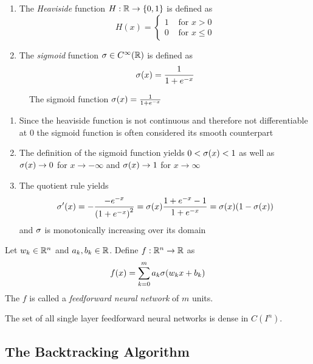 \begin{definition}
    \hfill
    \begin{enumerate}
        \item The \emph{Heaviside} function \( H: \mathbb{R} \to \{ 0, 1 \} \) is defined as
              \[
                  H(x) = \left \{
                  \begin{array}{ll}
                      1 & \text{ for } x > 0  \\
                      0 & \text{ for }x \le 0
                  \end{array}
                  \right.
              \]
        \item The \emph{sigmoid} function \( \sigma \in C^\infty(\mathbb{R}) \) is defined as
              \[
                  \sigma(x) = \frac{1}{1 + e^{-x}}
              \]
    \end{enumerate}
\end{definition}
\bigskip


\begin{figure}[H]
    \centering
    \plotsigmoid{}
    \caption{The sigmoid function \( \sigma(x) = \frac{1}{1 + e^{-x}} \)}\label{fig:sigmoid}
\end{figure}
\bigskip


\begin{remarks}
    \hfill
    \begin{enumerate}
        \item Since the heaviside function is not continuous and therefore not differentiable 
            at \( 0 \) the sigmoid function is often considered its smooth counterpart
        \item The definition of the sigmoid function yields \( 0 < \sigma(x) < 1 \) as well as
              \( \sigma(x) \to 0 \) for \( x \to -\infty \) and \( \sigma(x) \to 1 \) 
              for \( x \to \infty \)
        \item The quotient rule yields
              \[
                  \sigma'(x)
                  = -\frac{-e^{-x}}{{(1 + e^{-x})}^2}
                  = \sigma(x) \frac{1 + e^{-x} - 1}{1 + e^{-x}}
                  = \sigma(x)(1 - \sigma(x))
              \]
              and \( \sigma \) is monotonically increasing over its domain
    \end{enumerate}
\end{remarks}
\bigskip


\begin{definition}
    Let \( w_k \in \mathbb{R}^n \) and \( a_k, b_k \in \mathbb{R} \). Define \( f : \mathbb{R}^n \to \mathbb{R} \) as
    \[
        f(x) = \sum_{k = 0}^m a_k \sigma(w_k x + b_k)
    \]
    The \( f \) is called a \emph{feedforward neural network} of \( m \) units.
\end{definition}
\bigskip

\begin{theorem}\label{thm:universal_approximation}
    The set of all single layer feedforward neural networks is dense in \( C(I^n) \).
\end{theorem}

\subsection{The Backtracking Algorithm}
